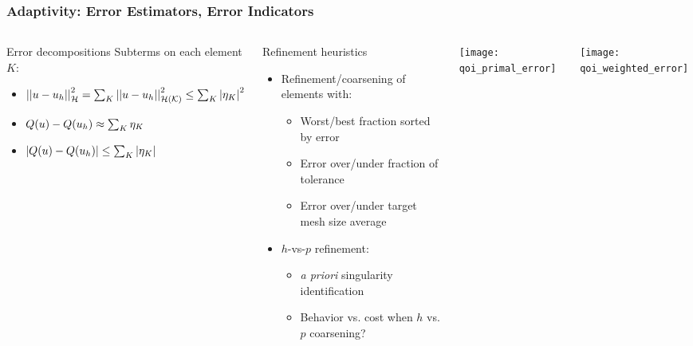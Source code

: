\begin{frame}
\frametitle{Adaptivity: Error Estimators, Error Indicators}
\begin{columns}
\begin{block}{Error decompositions}
        Subterms on each element $K$:
        \begin{itemize}
                \item $ \left|\left|u-u_h\right|\right|_\mathcal{H}^2 = 
                        \sum_K  \left|\left|u-u_h\right|\right|_\mathcal{H(K)}^2 \leq 
                        \sum_K  \left|\eta_K\right|^2$
                \item ${Q}(u) - {Q}(u_h) \approx \sum_K \eta_K$
                \item $ \left|{Q}(u) - {Q}(u_h)\right| \leq \sum_K  \left|\eta_K\right|$
        \end{itemize}
\end{block}
\begin{block}{Refinement heuristics}
        \begin{itemize}
        \item Refinement/coarsening of elements with:
        \begin{itemize}
                \item Worst/best fraction sorted by error
                \item Error over/under fraction of tolerance
                \item Error over/under target mesh size average
        \end{itemize}
        \item $h$-vs-$p$ refinement:
        \begin{itemize}
                \item {\textit{a priori}} singularity identification
                \item Behavior vs. cost when $h$ vs. $p$ coarsening?
        \end{itemize}
        \end{itemize}
\end{block}

\center
\texttt{[image: qoi\_primal\_error]}

\center
\texttt{[image: qoi\_weighted\_error]}
\end{columns}
\end{frame}




